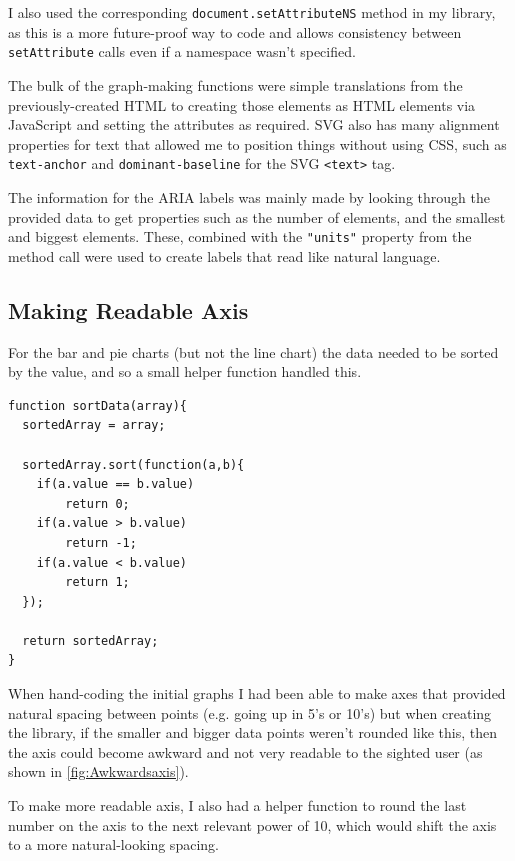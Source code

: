 \documentclass[ %
                    author={Aleena Baig},
                supervisor={Dr Simon Lock},
                    degree={BSc},
                     title={On Making Web Accessible Graphs},
                  subtitle={},
                      year={2019} ]{dissertation}
\begin{document}
I also used the corresponding \texttt{document.setAttributeNS} method in my library, as this is a more future-proof way to code and allows consistency between \texttt{setAttribute} calls even if a namespace wasn't specified.

The bulk of the graph-making functions were simple translations from the previously-created HTML to creating those elements as HTML elements via JavaScript and setting the attributes as required. SVG also has many alignment properties for text that allowed me to position things without using CSS, such as \texttt{text-anchor} and \texttt{dominant-baseline} for the SVG \texttt{<text>} tag.

The information for the ARIA labels was mainly made by looking through the provided data to get properties such as the number of elements, and the smallest and biggest elements. These, combined with the \texttt{"units"} property from the method call were used to create labels that read like natural language.


\subsection{Making Readable Axis}

For the bar and pie charts (but not the line chart) the data needed to be sorted by the value, and so a small helper function handled this.

\begin{lstlisting}
function sortData(array){
  sortedArray = array;

  sortedArray.sort(function(a,b){
    if(a.value == b.value)
        return 0;
    if(a.value > b.value)
        return -1;
    if(a.value < b.value)
        return 1;
  });

  return sortedArray;
}
\end{lstlisting}

When hand-coding the initial graphs I had been able to make axes that provided natural spacing between points (e.g. going up in 5's or 10's) but when creating the library, if the smaller and bigger data points weren't rounded like this, then the axis could become awkward and not very readable to the sighted user (as shown in \ref{fig:Awkwardsaxis}).

To make more readable axis, I also had a helper function to round the last number on the axis to the next relevant power of 10, which would shift the axis to a more natural-looking spacing.
\end{document}
